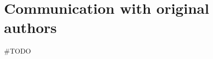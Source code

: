 \documentclass[11pt,a4paper,fleqn]{article}
\begin{document}



\section{Communication with original authors}
\#TODO





\end{document}
